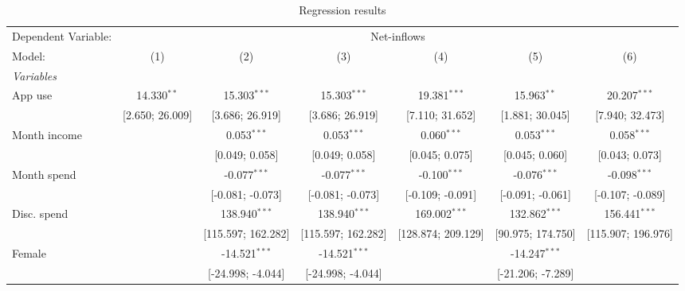 
\begin{table}[htbp]
   \centering
   \tiny
   \begin{threeparttable}[b]
      \caption{\label{tab:reg_compare} Regression results}
      \begin{tabular}{lcccccc}
         \tabularnewline \midrule \midrule
         Dependent Variable: & \multicolumn{6}{c}{Net-inflows}\\
         Model:                     & (1)                   & (2)                & (3)                & (4)                & (5)               & (6)\\  
         \midrule
         \emph{Variables}\\
         App use                    & 14.330$^{**}$         & 15.303$^{***}$     & 15.303$^{***}$     & 19.381$^{***}$     & 15.963$^{**}$     & 20.207$^{***}$\\   
                                    & [2.650; 26.009]       & [3.686; 26.919]    & [3.686; 26.919]    & [7.110; 31.652]    & [1.881; 30.045]   & [7.940; 32.473]\\   
         Month income               &                       & 0.053$^{***}$      & 0.053$^{***}$      & 0.060$^{***}$      & 0.053$^{***}$     & 0.058$^{***}$\\   
                                    &                       & [0.049; 0.058]     & [0.049; 0.058]     & [0.045; 0.075]     & [0.045; 0.060]    & [0.043; 0.073]\\   
         Month spend                &                       & -0.077$^{***}$     & -0.077$^{***}$     & -0.100$^{***}$     & -0.076$^{***}$    & -0.098$^{***}$\\   
                                    &                       & [-0.081; -0.073]   & [-0.081; -0.073]   & [-0.109; -0.091]   & [-0.091; -0.061]  & [-0.107; -0.089]\\   
         Disc. spend                &                       & 138.940$^{***}$    & 138.940$^{***}$    & 169.002$^{***}$    & 132.862$^{***}$   & 156.441$^{***}$\\   
                                    &                       & [115.597; 162.282] & [115.597; 162.282] & [128.874; 209.129] & [90.975; 174.750] & [115.907; 196.976]\\   
         Female                     &                       & -14.521$^{***}$    & -14.521$^{***}$    &                    & -14.247$^{***}$   &   \\   
                                    &                       & [-24.998; -4.044]  & [-24.998; -4.044]  &                    & [-21.206; -7.289] &   \\   

\end{tabular}
\end{threeparttable}
\end{table}

